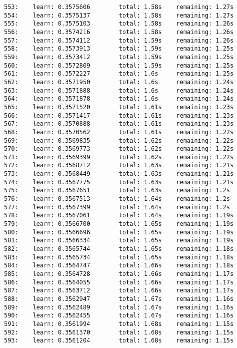 \documentclass[11pt]{article}
\begin{document}
\begin{Verbatim}[commandchars=\\\{\}]
553:    learn: 0.3575606        total: 1.58s    remaining: 1.27s
554:    learn: 0.3575137        total: 1.58s    remaining: 1.27s
555:    learn: 0.3575103        total: 1.58s    remaining: 1.26s
556:    learn: 0.3574216        total: 1.58s    remaining: 1.26s
557:    learn: 0.3574112        total: 1.59s    remaining: 1.26s
558:    learn: 0.3573913        total: 1.59s    remaining: 1.25s
559:    learn: 0.3573412        total: 1.59s    remaining: 1.25s
560:    learn: 0.3572809        total: 1.59s    remaining: 1.25s
561:    learn: 0.3572227        total: 1.6s     remaining: 1.25s
562:    learn: 0.3571950        total: 1.6s     remaining: 1.24s
563:    learn: 0.3571888        total: 1.6s     remaining: 1.24s
564:    learn: 0.3571878        total: 1.6s     remaining: 1.24s
565:    learn: 0.3571520        total: 1.61s    remaining: 1.23s
566:    learn: 0.3571417        total: 1.61s    remaining: 1.23s
567:    learn: 0.3570888        total: 1.61s    remaining: 1.23s
568:    learn: 0.3570562        total: 1.61s    remaining: 1.22s
569:    learn: 0.3569835        total: 1.62s    remaining: 1.22s
570:    learn: 0.3569773        total: 1.62s    remaining: 1.22s
571:    learn: 0.3569399        total: 1.62s    remaining: 1.22s
572:    learn: 0.3568712        total: 1.63s    remaining: 1.21s
573:    learn: 0.3568449        total: 1.63s    remaining: 1.21s
574:    learn: 0.3567775        total: 1.63s    remaining: 1.21s
575:    learn: 0.3567651        total: 1.63s    remaining: 1.2s
576:    learn: 0.3567513        total: 1.64s    remaining: 1.2s
577:    learn: 0.3567399        total: 1.64s    remaining: 1.2s
578:    learn: 0.3567061        total: 1.64s    remaining: 1.19s
579:    learn: 0.3566700        total: 1.65s    remaining: 1.19s
580:    learn: 0.3566696        total: 1.65s    remaining: 1.19s
581:    learn: 0.3566334        total: 1.65s    remaining: 1.19s
582:    learn: 0.3565744        total: 1.65s    remaining: 1.18s
583:    learn: 0.3565734        total: 1.65s    remaining: 1.18s
584:    learn: 0.3564747        total: 1.66s    remaining: 1.18s
585:    learn: 0.3564728        total: 1.66s    remaining: 1.17s
586:    learn: 0.3564055        total: 1.66s    remaining: 1.17s
587:    learn: 0.3563712        total: 1.66s    remaining: 1.17s
588:    learn: 0.3562947        total: 1.67s    remaining: 1.16s
589:    learn: 0.3562489        total: 1.67s    remaining: 1.16s
590:    learn: 0.3562455        total: 1.67s    remaining: 1.16s
591:    learn: 0.3561994        total: 1.68s    remaining: 1.15s
592:    learn: 0.3561370        total: 1.68s    remaining: 1.15s
593:    learn: 0.3561204        total: 1.68s    remaining: 1.15s

\end{Verbatim}
\end{document}

